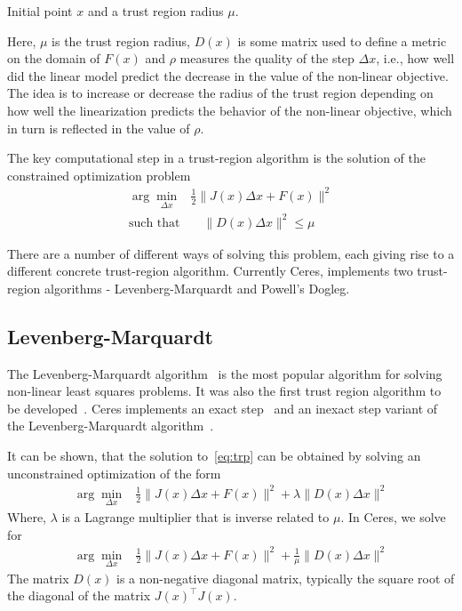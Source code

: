 \begin{algorithmic}
\REQUIRE Initial point $x$ and a trust region radius $\mu$.
\LOOP
{}
\IF {$\rho > \epsilon$}
\ENDIF
{}
\ELSE 
{}
\ENDIF
\ENDIF
\ENDLOOP
\end{algorithmic}

Here, $\mu$ is the trust region radius, $D(x)$ is some matrix used to define a metric on the domain of $F(x)$ and $\rho$ measures the quality of the step $\Delta x$, i.e., how well did the linear model predict the decrease in the value of the non-linear objective. The idea is to increase or decrease the radius of the trust region depending on how well the linearization predicts the behavior of the non-linear objective, which in turn is reflected in the value of $\rho$.

The key computational step in a trust-region algorithm is the solution of the constrained optimization problem
\begin{align}
	\arg\min_{\Delta x}& \frac{1}{2}\|J(x)\Delta x + F(x)\|^2 \\
	\text{such that}&\quad  \|D(x)\Delta x\|^2 \le \mu
\label{eq:trp}
\end{align}

There are a number of different ways of solving this problem, each giving rise to a different concrete trust-region algorithm. Currently Ceres, implements two trust-region algorithms - Levenberg-Marquardt and Powell's Dogleg.

\subsection{Levenberg-Marquardt}
The Levenberg-Marquardt algorithm~\cite{levenberg1944method, marquardt1963algorithm} is the most popular algorithm for solving non-linear least squares problems.  It was also the first trust region algorithm to be developed~\cite{levenberg1944method,marquardt1963algorithm}. Ceres implements an exact step~\cite{madsen2004methods} and an inexact step variant of the Levenberg-Marquardt algorithm~\cite{wright1985inexact,nash1990assessing}.  

It can be shown, that the solution to~\eqref{eq:trp} can be obtained by solving an unconstrained optimization of the form
\begin{align}
	\arg\min_{\Delta x}& \frac{1}{2}\|J(x)\Delta x + F(x)\|^2 +\lambda  \|D(x)\Delta x\|^2
\end{align}
Where, $\lambda$ is a Lagrange multiplier that is inverse related to $\mu$. In Ceres, we solve for 
\begin{align}
	\arg\min_{\Delta x}& \frac{1}{2}\|J(x)\Delta x + F(x)\|^2 + \frac{1}{\mu} \|D(x)\Delta x\|^2
\label{eq:lsqr}
\end{align}
The matrix $D(x)$ is a non-negative diagonal matrix, typically the square root of the diagonal of the matrix $J(x)^\top J(x)$.

